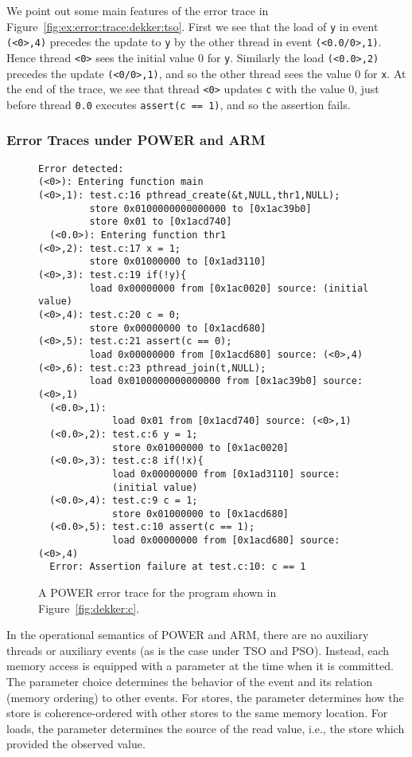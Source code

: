 \documentclass[a4paper]{article}
\begin{document}
We point out some main features of the error trace in
Figure~\ref{fig:ex:error:trace:dekker:tso}.
%
First we see that the load of \texttt{y} in event \texttt{(<0>,4)}
precedes the update to \texttt{y} by the other thread in event
\texttt{(<0.0/0>,1)}. Hence thread \texttt{<0>} sees the initial value
0 for \texttt{y}. Similarly the load \texttt{(<0.0>,2)} precedes the
update \texttt{(<0/0>,1)}, and so the other thread sees the value 0
for \texttt{x}.
%
At the end of the trace, we see that thread \texttt{<0>} updates
\texttt{c} with the value 0, just before thread \texttt{0.0} executes
\texttt{assert(c == 1)}, and so the assertion fails.

\subsubsection{Error Traces under POWER and ARM}

\begin{figure}
\begin{verbatim}
Error detected:
(<0>): Entering function main
(<0>,1): test.c:16 pthread_create(&t,NULL,thr1,NULL);
         store 0x0100000000000000 to [0x1ac39b0]
         store 0x01 to [0x1acd740]
  (<0.0>): Entering function thr1
(<0>,2): test.c:17 x = 1;
         store 0x01000000 to [0x1ad3110]
(<0>,3): test.c:19 if(!y){
         load 0x00000000 from [0x1ac0020] source: (initial value)
(<0>,4): test.c:20 c = 0;
         store 0x00000000 to [0x1acd680]
(<0>,5): test.c:21 assert(c == 0);
         load 0x00000000 from [0x1acd680] source: (<0>,4)
(<0>,6): test.c:23 pthread_join(t,NULL);
         load 0x0100000000000000 from [0x1ac39b0] source: (<0>,1)
  (<0.0>,1):
             load 0x01 from [0x1acd740] source: (<0>,1)
  (<0.0>,2): test.c:6 y = 1;
             store 0x01000000 to [0x1ac0020]
  (<0.0>,3): test.c:8 if(!x){
             load 0x00000000 from [0x1ad3110] source:
             (initial value)
  (<0.0>,4): test.c:9 c = 1;
             store 0x01000000 to [0x1acd680]
  (<0.0>,5): test.c:10 assert(c == 1);
             load 0x00000000 from [0x1acd680] source: (<0>,4)
  Error: Assertion failure at test.c:10: c == 1
\end{verbatim}
\caption{A POWER error trace for the program shown in Figure~\ref{fig:dekker:c}.}\label{fig:ex:error:trace:dekker:power}
\end{figure}

In the operational semantics of POWER and ARM, there are no auxiliary
threads or auxiliary events (as is the case under TSO and
PSO). Instead, each memory access is equipped with a parameter at the
time when it is committed. The parameter choice determines the
behavior of the event and its relation (memory ordering) to other
events. For stores, the parameter determines how the store is
coherence-ordered with other stores to the same memory location. For
loads, the parameter determines the source of the read value, i.e.,
the store which provided the observed value.
\end{document}
